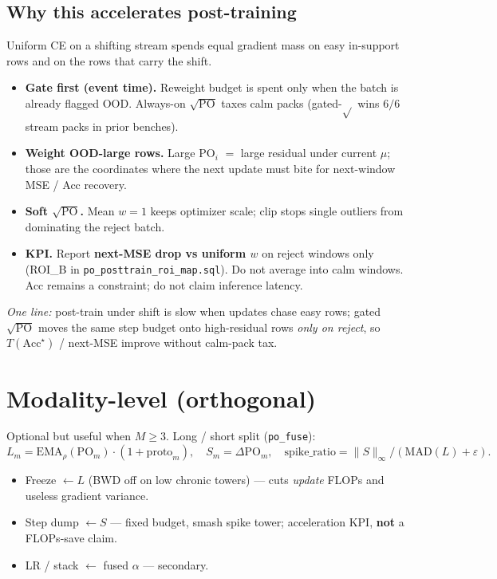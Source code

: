 \documentclass[11pt]{article}
\newcommand{\PO}{\mathrm{PO}}
\newcommand{\Acc}{\mathrm{Acc}}
\begin{document}
\subsection{Why this accelerates post-training}
Uniform CE on a shifting stream spends equal gradient mass on easy
in-support rows and on the rows that carry the shift.
\begin{itemize}[leftmargin=1.2em,itemsep=2pt]
  \item \textbf{Gate first (event time).}
        Reweight budget is spent only when the batch is already
        flagged OOD. Always-on $\sqrt{\PO}$ taxes calm packs
        (gated-$\sqrt{}$ wins $6/6$ stream packs in prior benches).
  \item \textbf{Weight OOD-large rows.}
        Large $\PO_i$ $=$ large residual under current $\mu$; those are
        the coordinates where the next update must bite for
        next-window MSE / Acc recovery.
  \item \textbf{Soft $\sqrt{\PO}$.}
        Mean $w=1$ keeps optimizer scale; clip stops single outliers
        from dominating the reject batch.
  \item \textbf{KPI.}
        Report \textbf{next-MSE drop vs uniform $w$} on reject windows
        only (ROI\_B in \texttt{po\_posttrain\_roi\_map.sql}).
        Do not average into calm windows. Acc remains a constraint;
        do not claim inference latency.
\end{itemize}

\noindent\textit{One line:}
post-train under shift is slow when updates chase easy rows;
gated $\sqrt{\PO}$ moves the same step budget onto high-residual rows
\emph{only on reject}, so $T(\Acc^\star)$ / next-MSE improve without
calm-pack tax.

\section{Modality-level (orthogonal)}
\label{sec:mod}

Optional but useful when $M\ge3$.
Long / short split (\texttt{po\_fuse}):
\[
  L_m=\mathrm{EMA}_\rho(\PO_m)\cdot(1+\mathrm{proto}_m),\quad
  S_m=\Delta\PO_m,\quad
  \mathrm{spike\_ratio}=\|S\|_\infty/(\mathrm{MAD}(L)+\varepsilon).
\]
\begin{itemize}[leftmargin=1.2em,itemsep=1pt]
  \item Freeze $\leftarrow L$ (BWD off on low chronic towers) ---
        cuts \emph{update} FLOPs and useless gradient variance.
  \item Step dump $\leftarrow S$ --- fixed budget, smash spike tower;
        acceleration KPI, \textbf{not} a FLOPs-save claim.
  \item LR / stack $\leftarrow$ fused $\alpha$ --- secondary.
\end{itemize}
\end{document}

